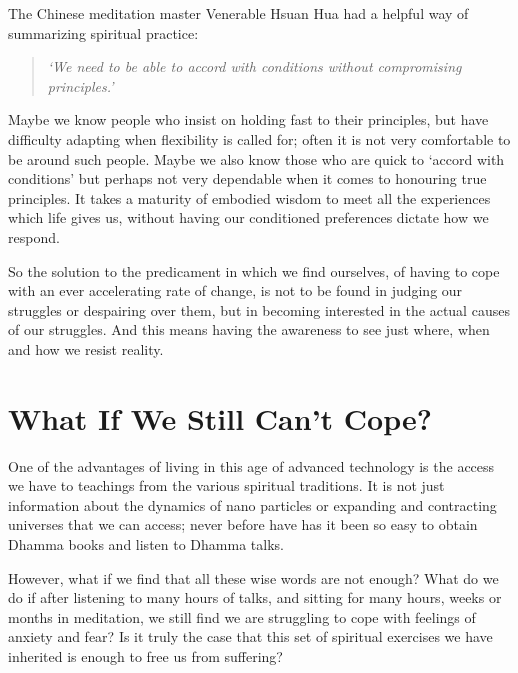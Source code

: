 The Chinese meditation master Venerable Hsuan Hua had a helpful way of
summarizing spiritual practice:

\begin{quote}
 \itshape
 `We need to be able to accord with conditions without compromising principles.'
\end{quote}

Maybe we know people who
insist on holding fast to their principles, but have difficulty adapting
when flexibility is called for; often it is not very comfortable to be
around such people. Maybe we also know those who are quick to `accord
with conditions' but perhaps not very dependable when it comes to
honouring true principles. It takes a maturity of embodied wisdom to
meet all the experiences which life gives us, without having our
conditioned preferences dictate how we respond.

So the solution to the predicament in which we find ourselves, of having
to cope with an ever accelerating rate of change, is not to be found in
judging our struggles or despairing over them, but in becoming
interested in the actual causes of our struggles. And this means having
the awareness to see just where, when and how we resist reality.

\section{What If We Still Can't Cope?}

One of the advantages of living in this age of advanced technology is
the access we have to teachings from the various spiritual traditions.
It is not just information about the dynamics of nano particles or
expanding and contracting universes that we can access; never before
have has it been so easy to obtain Dhamma books and listen to Dhamma
talks.

However, what if we find that all these wise words are not enough? What
do we do if after listening to many hours of talks, and sitting for many
hours, weeks or months in meditation, we still find we are struggling to
cope with feelings of anxiety and fear? Is it truly the case that this
set of spiritual exercises we have inherited is enough to free us from
suffering?

\enlargethispage{\baselineskip}

